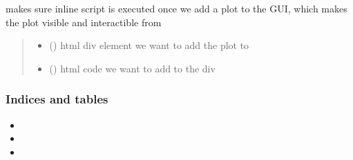 \documentclass[letterpaper,10pt,english]{sphinxmanual}
\begin{document}
\begin{fulllineitems}
\label{\detokenize{docs_gui/js_api/urbs_results/setup_urbs_results:setInnerHTML}}
\pysigstartsignatures
{}
\pysigstopsignatures
\sphinxAtStartPar
makes sure inline script is executed once we add a plot to the GUI, which makes the plot visible and interactible
from  
\begin{quote}\begin{description}
\begin{itemize}
\item {} 
\sphinxAtStartPar
{} () \textendash{} html div element we want to add the plot to

\item {} 
\sphinxAtStartPar
{} (\sphinxstyleliteralemphasis{\sphinxupquote{*}}) \textendash{} html code we want to add to the div

\end{itemize}

\end{description}\end{quote}

\end{fulllineitems}



\subsubsection{Indices and tables}
\label{\detokenize{docs_gui/index:indices-and-tables}}\begin{itemize}
\item {} 
\sphinxAtStartPar
{}

\item {} 
\sphinxAtStartPar
{}

\item {} 
\sphinxAtStartPar
{}

\end{itemize}



\renewcommand{\indexname}{Index}
\printindex
\end{document}
